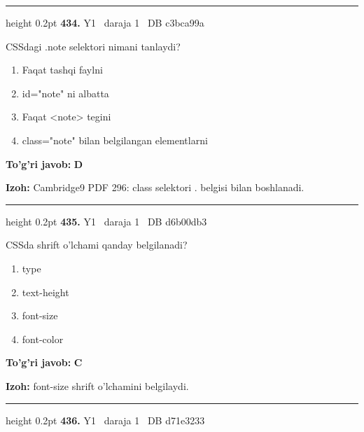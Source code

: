 \documentclass[10pt,a4paper,oneside]{article}
\begin{document}
\vspace{2mm}\hrule height 0.2pt \vspace{4mm}
\hypertarget{q434}{\textbf{\color{ink}434.}}  {\color{muted}\scriptsize Y1 \textbullet\ daraja 1 \textbullet\ DB c3bca99a}
\par
CSSdagi .note selektori nimani tanlaydi?
\begin{enumerate}[label=\Alph*),leftmargin=9mm]
\item Faqat tashqi faylni
\item id="note" ni albatta
\item Faqat \textless{}note\textgreater{} tegini
\item class="note" bilan belgilangan elementlarni
\end{enumerate}
\begin{tcolorbox}[enhanced,breakable,colback=teal!4,colframe=teal!45!black,boxrule=0.45pt,arc=1.2mm,left=2.8mm,right=2.8mm,top=2mm,bottom=2mm,before skip=2mm,after skip=2mm]
\textbf{\color{teal}To'g'ri javob:} \textbf{D}
\par\smallskip
\textbf{Izoh:} Cambridge9 PDF 296: class selektori . belgisi bilan boshlanadi.
\end{tcolorbox}
\vspace{2mm}\hrule height 0.2pt \vspace{4mm}
\hypertarget{q435}{\textbf{\color{ink}435.}}  {\color{muted}\scriptsize Y1 \textbullet\ daraja 1 \textbullet\ DB d6b00db3}
\par
CSSda shrift o'lchami qanday belgilanadi?
\begin{enumerate}[label=\Alph*),leftmargin=9mm]
\item type
\item text-height
\item font-size
\item font-color
\end{enumerate}
\begin{tcolorbox}[enhanced,breakable,colback=teal!4,colframe=teal!45!black,boxrule=0.45pt,arc=1.2mm,left=2.8mm,right=2.8mm,top=2mm,bottom=2mm,before skip=2mm,after skip=2mm]
\textbf{\color{teal}To'g'ri javob:} \textbf{C}
\par\smallskip
\textbf{Izoh:} font-size shrift o'lchamini belgilaydi.
\end{tcolorbox}
\vspace{2mm}\hrule height 0.2pt \vspace{4mm}
\hypertarget{q436}{\textbf{\color{ink}436.}}  {\color{muted}\scriptsize Y1 \textbullet\ daraja 1 \textbullet\ DB d71e3233}
\end{document}
